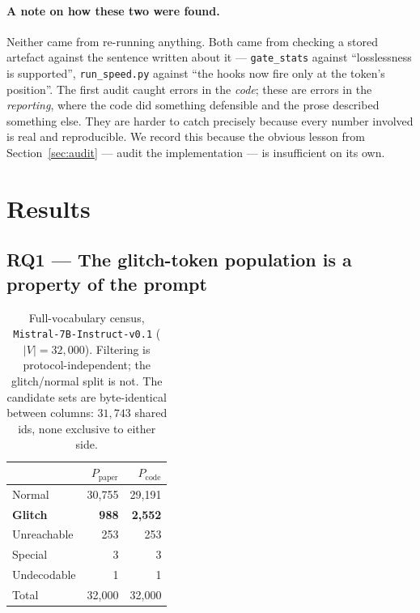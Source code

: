 \documentclass[11pt,a4paper]{article}
\newcommand{\Ppaper}{$P_{\mathrm{paper}}$}
\newcommand{\Pcode}{$P_{\mathrm{code}}$}
\begin{document}
\paragraph{A note on how these two were found.} Neither came from re-running
anything. Both came from checking a stored artefact against the sentence written
about it --- \texttt{gate\_stats} against ``losslessness is supported'',
\texttt{run\_speed.py} against ``the hooks now fire only at the token's
position''. The first audit caught errors in the \emph{code}; these are errors in
the \emph{reporting}, where the code did something defensible and the prose
described something else. They are harder to catch precisely because every number
involved is real and reproducible. We record this because the obvious lesson from
Section~\ref{sec:audit} --- audit the implementation --- is insufficient on its
own.

\section{Results}

\subsection{RQ1 --- The glitch-token population is a property of the prompt}
\label{sec:rq1}

\begin{table}[h]
\centering
\caption{Full-vocabulary census, \texttt{Mistral-7B-Instruct-v0.1}
($|V| = 32{,}000$). Filtering is protocol-independent; the glitch/normal split is
not. The candidate sets are byte-identical between columns: $31{,}743$ shared
ids, none exclusive to either side.}
\label{tab:census}
\begin{tabular}{lrr}
\toprule
& \Ppaper{} & \Pcode{} \\
\midrule
Normal            & 30{,}755 & 29{,}191 \\
\textbf{Glitch}   & \textbf{988} & \textbf{2{,}552} \\
Unreachable       & 253 & 253 \\
Special           & 3 & 3 \\
Undecodable       & 1 & 1 \\
\midrule
Total             & 32{,}000 & 32{,}000 \\
\bottomrule
\end{tabular}
\end{table}
\end{document}
